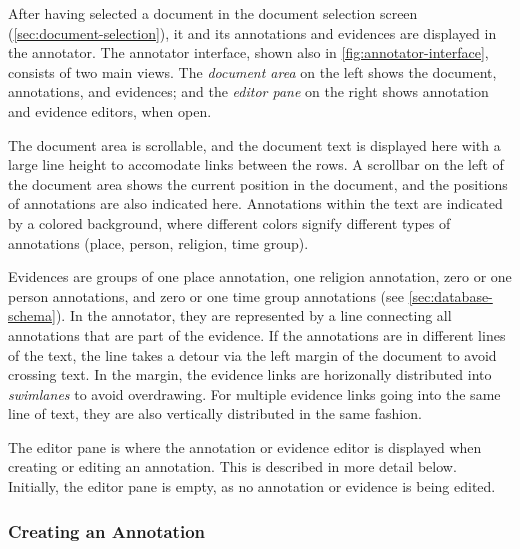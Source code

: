 After having selected a document in the document selection screen (\cref{sec:document-selection}), it and its annotations and evidences are displayed in the annotator.
The annotator interface, shown also in \cref{fig:annotator-interface}, consists of two main views.
The \emph{document area} on the left shows the document, annotations, and evidences;
and the \emph{editor pane} on the right shows annotation and evidence editors, when open.

The document area is scrollable, and the document text is displayed here with a large line height to accomodate links between the rows.
A scrollbar on the left of the document area shows the current position in the document, and the positions of annotations are also indicated here.
Annotations within the text are indicated by a colored background, where different colors signify different types of annotations (place, person, religion, time group).

Evidences are groups of one place annotation, one religion annotation, zero or one person annotations, and zero or one time group annotations (see \cref{sec:database-schema}).
In the annotator, they are represented by a line connecting all annotations that are part of the evidence.
If the annotations are in different lines of the text, the line takes a detour via the left margin of the document to avoid crossing text.
In the margin, the evidence links are horizonally distributed into \emph{swimlanes} to avoid overdrawing.
For multiple evidence links going into the same line of text, they are also vertically distributed in the same fashion.

The editor pane is where the annotation or evidence editor is displayed when creating or editing an annotation.
This is described in more detail below.
Initially, the editor pane is empty, as no annotation or evidence is being edited.


\subsubsection{Creating an Annotation}
\label{sec:annotation-creation}


